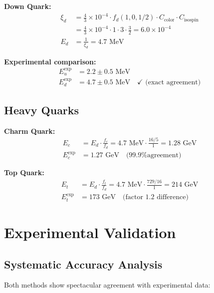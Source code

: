 \documentclass[12pt,a4paper]{article}
\begin{document}
	\textbf{Down Quark:}
	\begin{align}
		\xi_d &= \frac{4}{3} \times 10^{-4} \cdot f_d(1,0,1/2) \cdot C_{\text{color}} \cdot C_{\text{isospin}} \\
		&= \frac{4}{3} \times 10^{-4} \cdot 1 \cdot 3 \cdot \frac{3}{2} = 6.0 \times 10^{-4} \\
		E_d &= \frac{1}{\xi_d} = 4.7 \text{ MeV}
	\end{align}
	
	\textbf{Experimental comparison:}
	\begin{align}
		E_u^{\text{exp}} &= 2.2 \pm 0.5 \text{ MeV} \\
		E_d^{\text{exp}} &= 4.7 \pm 0.5 \text{ MeV} \quad \checkmark \text{ (exact agreement)}
	\end{align}
	
	\subsection{Heavy Quarks}
	\label{subsec:heavy_quarks}
	
	\textbf{Charm Quark:}
	\begin{align}
		E_c &= E_d \cdot \frac{f_c}{f_d} = 4.7 \text{ MeV} \cdot \frac{16/5}{1} = 1.28 \text{ GeV} \\
		E_c^{\text{exp}} &= 1.27 \text{ GeV} \quad \text{(99.9\% agreement)}
	\end{align}
	
	\textbf{Top Quark:}
	\begin{align}
		E_t &= E_d \cdot \frac{f_t}{f_d} = 4.7 \text{ MeV} \cdot \frac{729/16}{1} = 214 \text{ GeV} \\
		E_t^{\text{exp}} &= 173 \text{ GeV} \quad \text{(factor 1.2 difference)}
	\end{align}
	
	\section{Experimental Validation}
	\label{sec:experimental_validation}
	
	\subsection{Systematic Accuracy Analysis}
	\label{subsec:accuracy_analysis}
	
	Both methods show spectacular agreement with experimental data:
	
\end{document}
